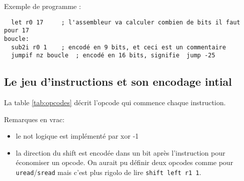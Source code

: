\documentclass[architecture]{compas2018}
\begin{document}
Exemple de programme :
\begin{verbatim}
  let r0 17     ; l'assembleur va calculer combien de bits il faut pour 17
boucle:	
  sub2i r0 1    ; encodé en 9 bits, et ceci est un commentaire
  jumpif nz boucle  ; encodé en 16 bits, signifie  jump -25 
\end{verbatim}

\subsection{Le jeu d'instructions et son encodage intial}



La table \ref{tab:opcodes} décrit l'opcode qui commence chaque instruction.

Remarques en vrac: 
\begin{itemize}
\item le not logique est implémenté par xor -1
\item la direction du shift est encodée dans un bit après l'instruction pour économiser un opcode. On aurait pu définir deux opcodes comme pour \texttt{uread}/\texttt{sread} mais c'est plus rigolo de lire \texttt{shift left r1 1}.
\end{itemize}
\end{document}
